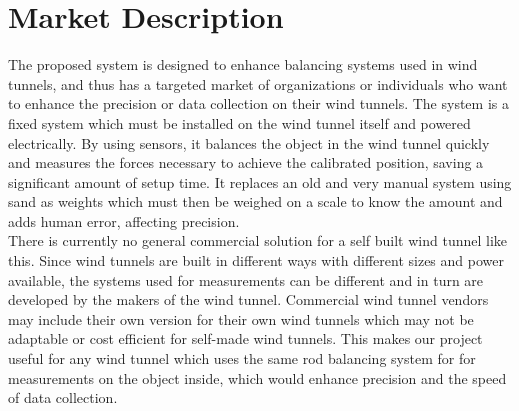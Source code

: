 \section{Market Description}
	The proposed system is designed to enhance balancing systems used in wind tunnels, and thus has a targeted market of organizations or individuals who want to enhance the precision or data collection on their wind tunnels. The system is a fixed system which must be installed on the wind tunnel itself and powered electrically. By using sensors, it balances the object in the wind tunnel quickly and measures the forces necessary to achieve the calibrated position, saving a significant amount of setup time. It replaces an old and very manual system using sand as weights which must then be weighed on a scale to know the amount and adds human error, affecting precision.\\

	
	There is currently no general commercial solution for a self built wind tunnel like this. Since wind tunnels are built in different ways with different sizes and power available, the systems used for measurements can be different and in turn are developed by the makers of the wind tunnel. Commercial wind tunnel vendors may include their own version for their own wind tunnels which may not be adaptable or cost efficient for self-made wind tunnels. This makes our project useful for any wind tunnel which uses the same rod balancing system for for measurements on the object inside, which would enhance precision and the speed of data collection.